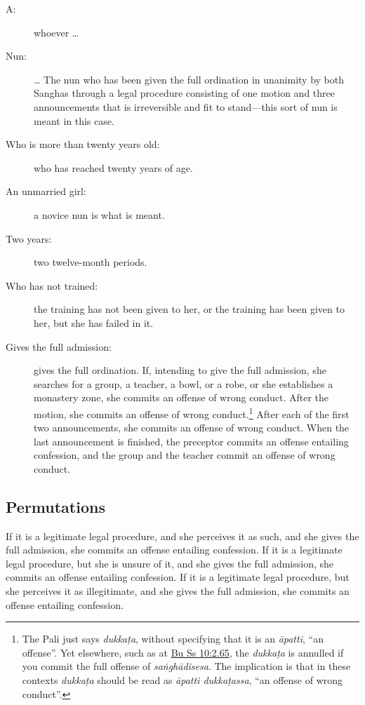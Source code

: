 \documentclass[12pt,openany]{book}%
\begin{document}
\begin{description}%
\item[A: ] whoever … %
\item[Nun: ] … The nun who has been given the full ordination in unanimity by both Sanghas through a legal procedure consisting of one motion and three announcements that is irreversible and fit to stand—this sort of nun is meant in this case. %
\item[Who is more than twenty years old: ] who has reached twenty years of age. %
\item[An unmarried girl: ] a novice nun is what is meant. %
\item[Two years: ] two twelve-month periods. %
\item[Who has not trained: ] the training has not been given to her, or the training has been given to her, but she has failed in it. %
\item[Gives the full admission: ] gives the full ordination. If, intending to give the full admission, she searches for a group, a teacher, a bowl, or a robe, or she establishes a monastery zone, she commits an offense of wrong conduct. After the motion, she commits an offense of wrong conduct.\footnote{The Pali just says \textit{\textsanskrit{dukkaṭa}}, without specifying that it is an \textit{\textsanskrit{āpatti}}, “an offense”. Yet elsewhere, such as at \href{https://suttacentral.net/pli-tv-bu-vb-ss10/en/brahmali\#2.65}{Bu Ss 10:2.65}, the \textit{\textsanskrit{dukkaṭa}} is annulled if you commit the full offense of \textit{\textsanskrit{saṅghādisesa}}. The implication is that in these contexts \textit{\textsanskrit{dukkaṭa}} should be read as \textit{\textsanskrit{āpatti} \textsanskrit{dukkaṭassa}}, “an offense of wrong conduct”. } After each of the first two announcements, she commits an offense of wrong conduct. When the last announcement is finished, the preceptor commits an offense entailing confession, and the group and the teacher commit an offense of wrong conduct. %
\end{description}

\subsection*{Permutations }

If it is a legitimate legal procedure, and she perceives it as such, and she gives the full admission, she commits an offense entailing confession. If it is a legitimate legal procedure, but she is unsure of it, and she gives the full admission, she commits an offense entailing confession. If it is a legitimate legal procedure, but she perceives it as illegitimate, and she gives the full admission, she commits an offense entailing confession. 
\end{document}
